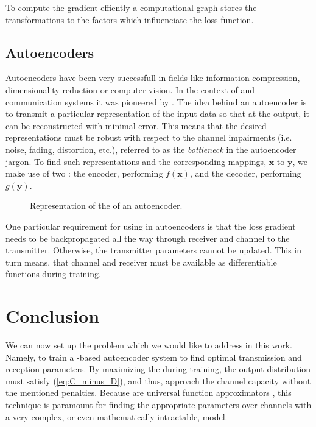 To compute the gradient effiently a computational graph stores the transformations to the factors which influenciate the loss function. 

\subsection{Autoencoders}
Autoencoders have been very successfull in fields like information compression, dimensionality reduction or computer vision. In the context of  and communication systems it was pioneered by \citet{O'Shea}. The idea behind an autoencoder is to transmit a particular representation of the input data so that at the output, it can be reconstructed with minimal error. This means that the desired representations must be robust with respect to the channel impairments (i.e. noise, fading, distortion, etc.), referred to as the \textit{bottleneck} in the autoencoder jargon. To find such representations and the corresponding mappings, $\textbf{x}$ to $\textbf{y}$, we make use of two : the encoder, performing $f(\textbf{x})$, and the decoder, performing $g(\textbf{y})$. %

\begin{figure}[h]
\centering

\caption{Representation of the  of an autoencoder.}
\label{fig:autoencoder}
\end{figure}

One particular requirement for using  in autoencoders is that the loss gradient needs to be backpropagated all the way through receiver and channel to the transmitter. Otherwise, the transmitter parameters cannot be updated. This in turn means, that channel and receiver must be available as differentiable functions during training.
\section{Conclusion}
We can now set up the problem which we would like to address in this work. Namely, to train a -based autoencoder system to find optimal transmission and reception parameters. By maximizing the  during training, the output distribution must satisfy (\ref{eq:C_minus_D}), and thus, approach the channel capacity without the mentioned penalties. Because  are universal function approximators \cite{HORNIK1989359}, this technique is paramount for finding the appropriate parameters over channels with a very complex, or even mathematically intractable, model.